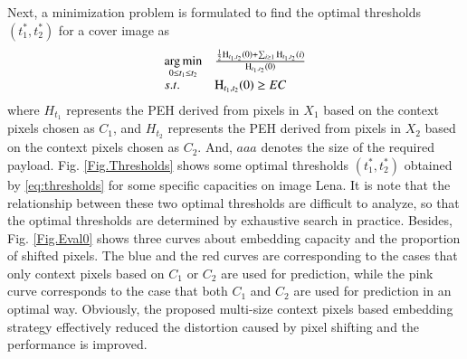 \documentclass[review,3p,10pt,sort&compress]{elsarticle}
\begin{document}
Next, a minimization problem is formulated to find the optimal thresholds $(t_1^*, t_2^*)$ for a cover image as
\begin{equation}\label{eq:thresholds}
\begin{array}{ll}
\mathop{\arg\min}\limits_{0 \leq t_1 \leq t_2} & \frac{\frac{1}{2}{\rm H}_{t_1, t_2}(0) + \sum_{i \geq 1}{\rm H}_{t_1, t_2}(i)}{{\rm H}_{t_1, t_2}(0)}\\
s.t.                                    & {\rm H}_{t_1, t_2}(0) \geq EC
\end{array}
\end{equation}
where $H_{t_1}$ represents the PEH derived from pixels in $X_1$ based on the context pixels chosen as $C_1$, and $H_{t_2}$ represents the PEH derived from pixels in $X_2$ based on the context pixels chosen as $C_2$. And, $aaa$ denotes the size of the required payload.
Fig. \ref{Fig.Thresholds} shows some optimal thresholds $(t_1^*, t_2^*)$ obtained by \eqref{eq:thresholds} for some specific capacities on image Lena. It is note that the relationship between these two optimal thresholds are difficult to analyze, so that the optimal thresholds are determined by exhaustive search in practice. Besides, Fig. \ref{Fig.Eval0} shows three curves about embedding capacity and the proportion of shifted pixels. The blue and the red curves are corresponding to the cases that only context pixels based on $C_1$ or $C_2$ are used for prediction, while the pink curve corresponds to the case that both $C_1$ and $C_2$ are used for prediction in an optimal way. Obviously, the proposed multi-size context pixels based embedding strategy effectively reduced the distortion caused by pixel shifting and the performance is improved.
\end{document}
